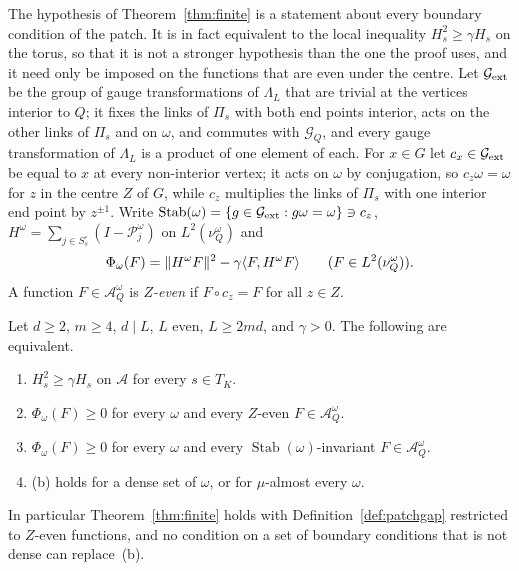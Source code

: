 The hypothesis of Theorem~\ref{thm:finite} is a statement about every
boundary condition of the patch. It is in fact equivalent to the local
inequality $H_s^2\ge\gamma H_s$ on the torus, so that it is not a stronger
hypothesis than the one the proof uses, and it need only be imposed on the
functions that are even under the centre. Let $\mathcal G_{\rm ext}$ be the
group of gauge transformations of $\Lambda_L$ that are trivial at the
vertices interior to $Q$; it fixes the links of $\Pi_s$ with both end
points interior, acts on the other links of $\Pi_s$ and on $\omega$, and
commutes with $\mathcal G_Q$, and every gauge transformation of $\Lambda_L$
is a product of one element of each. For $x\in G$ let $c_x\in\mathcal G_{\rm
ext}$ be equal to $x$ at every non-interior vertex; it acts on $\omega$ by
conjugation, so $c_z\omega=\omega$ for $z$ in the centre $Z$ of $G$, while
$c_z$ multiplies the links of $\Pi_s$ with one interior end point by $z^{\pm
1}$. Write $\operatorname{Stab}(\omega)=\{g\in\mathcal G_{\rm ext}:g\omega=
\omega\}\ni c_z$, $H^\omega=\sum_{j\in S^\circ_s}(I-\mathcal P^\omega_j)$ on
$L^2(\nu^\omega_Q)$ and
\[
\Phi_\omega(F)=\|H^\omega F\|^2-\gamma\langle F,H^\omega F\rangle\qquad(F\in L^2(\nu^
\omega_Q)).
\]
A function $F\in\mathcal A^\omega_Q$ is \emph{$Z$-even} if $F\circ c_z=F$ for
all $z\in Z$.

\begin{proposition}\label{prop:fibre}
Let $d\ge2$, $m\ge4$, $d\mid L$, $L$ even, $L\ge2md$, and $\gamma>0$. The
following are equivalent.
\begin{enumerate}[label=\textup{(\alph*)},leftmargin=*]
\item $H_s^2\ge\gamma H_s$ on $\mathcal A$ for every $s\in T_K$.
\item $\Phi_\omega(F)\ge0$ for every $\omega$ and every $Z$-even $F\in
\mathcal A^\omega_Q$.
\item $\Phi_\omega(F)\ge0$ for every $\omega$ and every $\operatorname{Stab}
(\omega)$-invariant $F\in\mathcal A^\omega_Q$.
\item \textup{(b)} holds for a dense set of $\omega$, or for $\mu$-almost
every $\omega$.
\end{enumerate}
In particular Theorem~\ref{thm:finite} holds with Definition~\ref{def:patchgap}
restricted to $Z$-even functions, and no condition on a set of boundary
conditions that is not dense can replace~\textup{(b)}.
\end{proposition}

